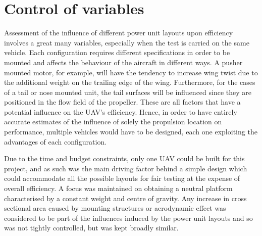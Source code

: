 \documentclass[../../main.tex]{subfiles}
\begin{document}
\section{Control of variables} \label{sec:final-design-proposal:control-of-variables}

Assessment of the influence of different power unit layouts upon efficiency involves a great many variables, especially when the test is carried on the same vehicle.
Each configuration requires different specifications in order to be mounted and affects the behaviour of the aircraft in different ways.
A pusher mounted motor, for example, will have the tendency to increase wing twist due to the additional weight on the trailing edge of the wing.
Furthermore, for the cases of a tail or nose mounted unit, the tail surfaces will be influenced since they are positioned in the flow field of the propeller.
These are all factors that have a potential influence on the UAV's efficiency.
Hence, in order to have entirely accurate estimates of the influence of solely the propulsion location on performance, multiple vehicles would have to be designed, each one exploiting the advantages of each configuration. 

Due to the time and budget constraints, only one UAV could be built for this project, and as such was the main driving factor behind a simple design which could accommodate all the possible layouts for fair testing at the expense of overall efficiency.
A focus was maintained on obtaining a neutral platform characterised by a constant weight and centre of gravity.
Any increase in cross sectional area caused by mounting structures or aerodynamic effect was considered to be part of the influences induced by the power unit layouts and so was not tightly controlled, but was kept broadly similar. 

\end{document}
